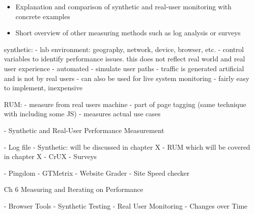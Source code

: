 \begin{itemize}
\item Explanation and comparison of synthetic and real-user monitoring with concrete examples
\item Short overview of other measuring methods such as log analysis or surveys
\end{itemize}








synthetic:
- lab environment: geography, network, device, browser, etc.
- control variables to identify performance issues. this does not reflect real world and real user experience
- automated
- simulate user paths
- traffic is generated artificial and is not by real users
 - can also be used for live system monitoring
 - fairly easy to implement, inexpensive

RUM:
- measure from real users machine
- part of page tagging (same technique with including some JS)
- measures actual use cases



- Synthetic and Real-User Performance Measurement



- Log file
- Synthetic: will be discussed in chapter X
- RUM which will be covered in chapter X
- CrUX
- Surveys


- Pingdom
- GTMetrix
- Website Grader
- Site Speed checker












Ch 6 Measuring and Iterating on Performance

- Browser Tools
- Synthetic Testing
- Real User Monitoring
- Changes over Time








